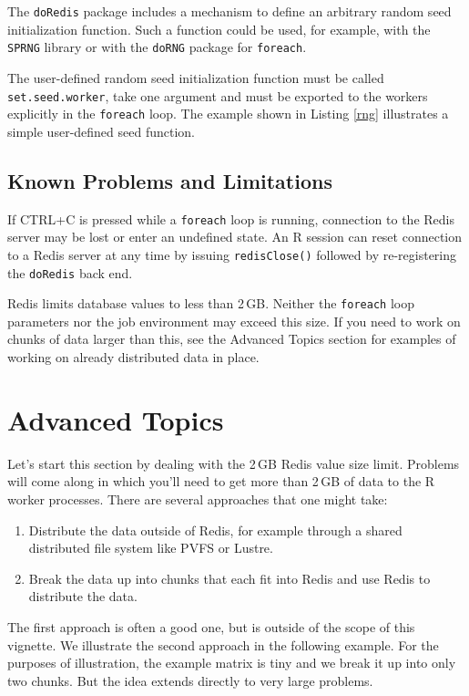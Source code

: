\documentclass[12pt]{article}
\begin{document}
The {\tt doRedis} package includes a mechanism to define an arbitrary random
seed initialization function. Such a function could be used, for example, with
the {\tt SPRNG} library or with the \verb+doRNG+ package for \verb+foreach+.

The user-defined random seed initialization function must be called {\tt
set.seed.worker}, take one argument and must be exported to the workers
explicitly in the {\tt foreach} loop. The example shown in Listing \ref{rng}
illustrates a simple user-defined seed function.


\subsection{Known Problems and Limitations}

If CTRL+C is pressed while a {\tt foreach} loop is running, connection to the
Redis server may be lost or enter an undefined state. An R session can reset
connection to a Redis server at any time by issuing \verb+redisClose()+
followed by re-registering the {\tt doRedis} back end.

Redis limits database values to less than 2\,GB. Neither the \verb+foreach+
loop parameters nor the job environment may exceed this size. If you need to
work on chunks of data larger than this, see the Advanced Topics section
for examples of working on already distributed data in place.




\section{Advanced Topics}

Let's start this section by dealing with the 2\,GB Redis value size limit.
Problems will come along in which you'll need to get more than
2\,GB of data to the R worker processes. There
are several approaches that one might take:
\begin{enumerate}
\item Distribute the data outside of Redis, for example through a shared
      distributed file system like PVFS or Lustre.
\item Break the data up into chunks that each fit into Redis and use
      Redis to distribute the data.
\end{enumerate}
The first approach is often a good one, but is outside of the scope of this
vignette. We illustrate the second approach in the following example.
For the purposes of illustration, the example matrix is tiny and we break it
up into only two chunks. But the idea extends directly to very large
problems.
\end{document}

